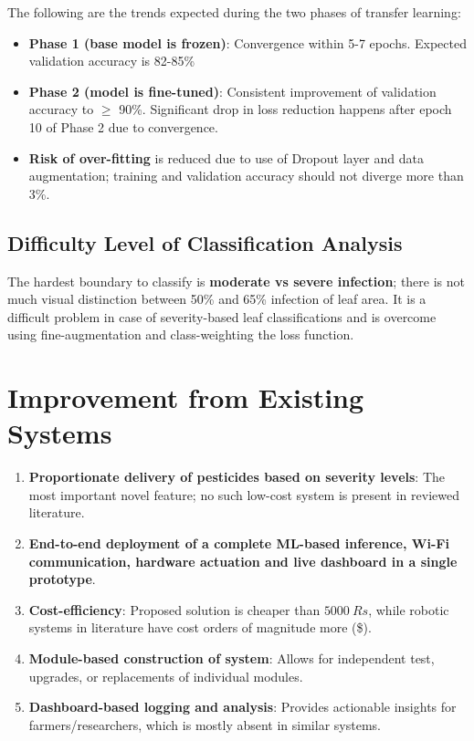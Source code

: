 \documentclass[12pt,a4paper,oneside]{report}
\begin{document}
The following are the trends expected during the two phases of transfer learning:

\begin{itemize}[leftmargin=2em]
    \item \textbf{Phase 1 (base model is frozen)}: Convergence within 5-7 epochs. Expected validation accuracy is 82-85\%
    \item \textbf{Phase 2 (model is fine-tuned)}: Consistent improvement of validation accuracy to $\geq$ 90\%. Significant drop in loss reduction happens after epoch 10 of Phase 2 due to convergence.
    \item \textbf{Risk of over-fitting} is reduced due to use of Dropout layer and data augmentation; training and validation accuracy should not diverge more than 3\%.
\end{itemize}

\subsection{Difficulty Level of Classification Analysis}

The hardest boundary to classify is \textbf{moderate vs severe infection}; there is not much visual distinction between 50\% and 65\% infection of leaf area. It is a difficult problem in case of severity-based leaf classifications and is overcome using fine-augmentation and class-weighting the loss function.

\section{Improvement from Existing Systems}

\begin{enumerate}[leftmargin=2em]
    \item \textbf{Proportionate delivery of pesticides based on severity levels}: The most important novel feature; no such low-cost system is present in reviewed literature.
    \item \textbf{End-to-end deployment of a complete ML-based inference, Wi-Fi communication, hardware actuation and live dashboard in a single prototype}.
    \item \textbf{Cost-efficiency}: Proposed solution is cheaper than $5000~Rs$, while robotic systems in literature have cost orders of magnitude more (\$).
    \item \textbf{Module-based construction of system}: Allows for independent test, upgrades, or replacements of individual modules.
    \item \textbf{Dashboard-based logging and analysis}: Provides actionable insights for farmers/researchers, which is mostly absent in similar systems.
\end{enumerate}
\end{document}
